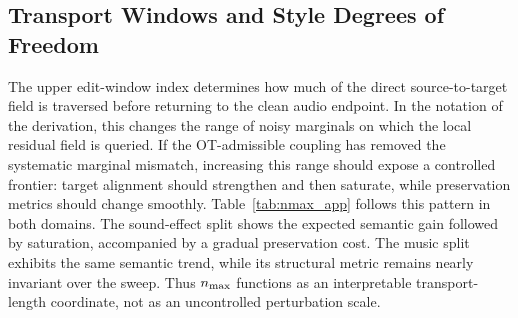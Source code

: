 \subsection{Transport Windows and Style Degrees of Freedom}
\label{app:edit_window_style}

The upper edit-window index determines how much of the direct source-to-target field is traversed before returning to the clean audio endpoint.
In the notation of the derivation, this changes the range of noisy marginals on which the local residual field is queried.
If the OT-admissible coupling has removed the systematic marginal mismatch, increasing this range should expose a controlled frontier: target alignment should strengthen and then saturate, while preservation metrics should change smoothly.
Table~\ref{tab:nmax_app} follows this pattern in both domains.
The sound-effect split shows the expected semantic gain followed by saturation, accompanied by a gradual preservation cost.
The music split exhibits the same semantic trend, while its structural metric remains nearly invariant over the sweep.
Thus $n_{\max}$ functions as an interpretable transport-length coordinate, not as an uncontrolled perturbation scale.

